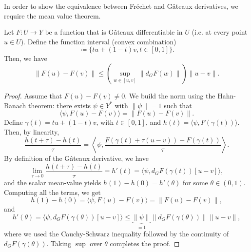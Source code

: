 In order to show the equivalence between Fréchet and Gâteaux derivatives, we require the mean value theorem. 
\begin{theorem}\label{thm:mean-value-banach}
    Let $F:U\to Y$ be a function that is Gâteaux differentiable in $U$ (i.e. at every point $u\in U$). Define the function interval (convex combination)
    \begin{equation}
        [u,v] \coloneqq \{tu+(1-t)v, t\in[0,1]\}.
    \end{equation}
    Then, we have
    \begin{equation}
        \|F(u)-F(v)\| \leq \left(\sup_{w\in[u,v]} \|d_G F(w)\|\right) \|u-v\|. 
    \end{equation}
    \begin{proof}
        Assume that $F(u)-F(v)\neq 0$. We build the norm using the Hahn-Banach theorem: there exists $\psi \in Y^*$ with $\|\psi\|=1$ such that 
        \begin{equation*}
            \langle \psi, F(u)-F(v)\rangle = \|F(u)-F(v)\|. 
        \end{equation*}    
        Define $\gamma(t) = tu + (1-t)v$, with $t\in [0,1]$, and $h(t)=\langle \psi, F(\gamma(t))\rangle$. Then, by linearity, 
        \begin{equation*}
            \frac{h(t+\tau) - h(t)}{\tau} = \left\langle \psi, \frac{F(\gamma(t) + \tau(u-v)) - F(\gamma(t))}{\tau} \right\rangle.
        \end{equation*}
        By definition of the Gâteaux derivative, we have
        \begin{equation*}
            \lim_{\tau\to 0} \frac{h(t+\tau) - h(t)}{\tau} = h'(t) = \langle \psi, d_G F(\gamma(t)) [u-v]\rangle, 
        \end{equation*}
        and the scalar mean-value yields $h(1)-h(0) = h'(\theta)$ for some $\theta\in(0,1)$. Computing all the terms, we get
        \begin{equation*}
            h(1)-h(0) = \langle \psi, F(u)-F(v)\rangle = \|F(u)-F(v)\|,
        \end{equation*}
        and 
        \begin{equation*}
            h'(\theta) = \langle \psi, d_G F(\gamma(\theta))[u-v]\rangle \leq \underbrace{\|\psi\|}_{=1} \|d_G F(\gamma(\theta))\| \|u-v\|,
        \end{equation*}
        where we used the Cauchy-Schwarz inequality followed by the continuity of $d_G F(\gamma(\theta))$. Taking $\sup$ over $\theta$ completes the proof. 
    \end{proof}
\end{theorem}

